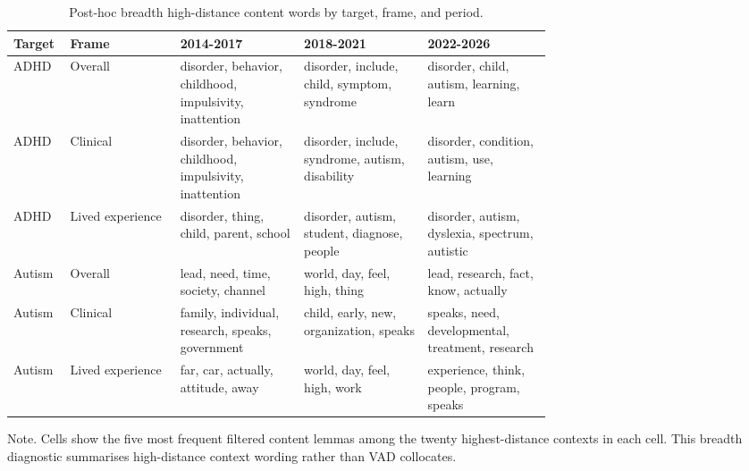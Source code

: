 \begin{table}[t!]
\centering
\caption{Post-hoc breadth high-distance content words by target, frame, and period.}
\label{tab:posthoc-breadth}
\scriptsize
\setlength{\tabcolsep}{3.5pt}
\renewcommand{\arraystretch}{1.25}
\begin{tabular}{@{}llp{0.235\linewidth}p{0.235\linewidth}p{0.235\linewidth}@{}}
\toprule
Target & Frame & 2014-2017 & 2018-2021 & 2022-2026 \\
\midrule
ADHD & Overall & disorder, behavior, childhood, impulsivity, inattention & disorder, include, child, symptom, syndrome & disorder, child, autism, learning, learn \\
ADHD & Clinical & disorder, behavior, childhood, impulsivity, inattention & disorder, include, syndrome, autism, disability & disorder, condition, autism, use, learning \\
ADHD & Lived experience & disorder, thing, child, parent, school & disorder, autism, student, diagnose, people & disorder, autism, dyslexia, spectrum, autistic \\
Autism & Overall & lead, need, time, society, channel & world, day, feel, high, thing & lead, research, fact, know, actually \\
Autism & Clinical & family, individual, research, speaks, government & child, early, new, organization, speaks & speaks, need, developmental, treatment, research \\
Autism & Lived experience & far, car, actually, attitude, away & world, day, feel, high, work & experience, think, people, program, speaks \\
\bottomrule
\end{tabular}
\parbox{\linewidth}{\footnotesize Note. Cells show the five most frequent filtered content lemmas among the twenty highest-distance contexts in each cell. This breadth diagnostic summarises high-distance context wording rather than VAD collocates.}
\end{table}
